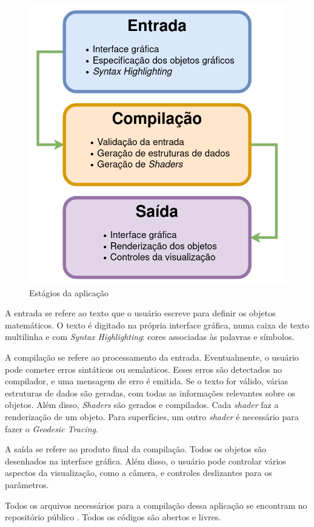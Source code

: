 \begin{figure}[!ht]
    \centering
    \includegraphics[width=0.6\linewidth]{chart.png}
    \caption{Estágios da aplicação}
    \label{img:chart}
\end{figure}

A entrada se refere ao texto que o usuário escreve para definir os objetos matemáticos.
O texto é digitado na própria interface gráfica, numa caixa de texto multilinha
e com \textit{Syntax Highlighting}: cores associadas às palavras e símbolos.

A compilação se refere ao processamento da entrada.
Eventualmente, o usuário pode cometer erros sintáticos ou semânticos.
Esses erros são detectados no compilador, e uma mensagem de erro é emitida.
Se o texto for válido, várias estruturas de dados são geradas,
com todas as informações relevantes sobre os objetos. Além disso,
\textit{Shaders} são gerados e compilados.
Cada \textit{shader} faz a renderização de um objeto.
Para superfícies, um outro \textit{shader} é necessário para fazer o \textit{Geodesic Tracing}.

A saída se refere ao produto final da compilação.
Todos os objetos são desenhados na interface gráfica.
Além disso, o usuário pode controlar vários aspectos da visualização,
como a câmera, e controles deslizantes para os parâmetros.

Todos os arquivos necessários para a compilação dessa aplicação se encontram
no repositório público \cite{TCC}. Todos os códigos são abertos e livres.